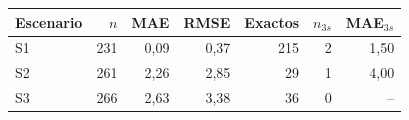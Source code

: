 \begin{tabular}{lrrrrrr}
\hline
Escenario & $n$ & MAE & RMSE & Exactos & $n_{3s}$ & MAE$_{3s}$ \\
\hline
S1 & 231 & 0{,}09 & 0{,}37 & 215 & 2 & 1{,}50 \\
S2 & 261 & 2{,}26 & 2{,}85 & 29 & 1 & 4{,}00 \\
S3 & 266 & 2{,}63 & 3{,}38 & 36 & 0 & -- \\
\hline
\end{tabular}
